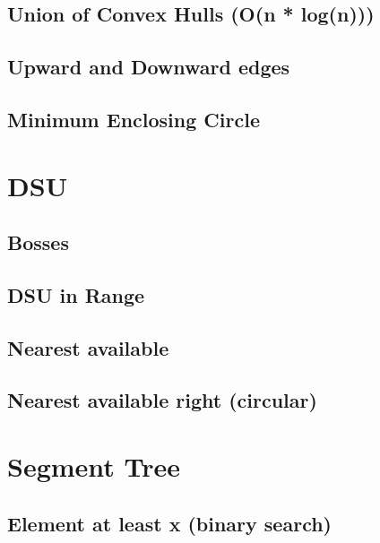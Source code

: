 \subsection{Union of Convex Hulls (O(n * log(n)))}
\raggedbottom
\hrulefill
\subsection{Upward and Downward edges}
\raggedbottom
\hrulefill
\subsection{Minimum Enclosing Circle}
\raggedbottom
\hrulefill

\section{DSU}
\subsection{Bosses}
\raggedbottom
\hrulefill
\subsection{DSU in Range}
\raggedbottom
\hrulefill
\subsection{Nearest available}
\raggedbottom
\hrulefill
\subsection{Nearest available right (circular)}
\raggedbottom
\hrulefill

\section{Segment Tree}
\subsection{Element at least x (binary search)}
\raggedbottom
\hrulefill

